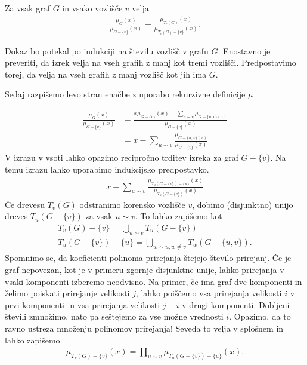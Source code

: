 \begin{lema}
    Za vsak graf \(G\) in vsako vozlišče \(v\) velja
    \begin{align*}
        \frac{\mu_G(x)}{\mu_{G-\{v\}}(x)} = \frac{\mu_{T_v(G)}(x)}{\mu_{T_v(G)-\{v\}}(x)}.
    \end{align*}
\end{lema}
\begin{dokaz}
    Dokaz bo potekal po indukciji na številu vozlišč v grafu \(G\). Enostavno je preveriti, da izrek velja na vseh grafih z manj kot tremi vozlišči. Predpostavimo torej, da velja na vseh grafih z manj vozlišč kot jih ima \(G\).

    Sedaj razpišemo levo stran enačbe z uporabo rekurzivne definicije \(\mu\)

    \begin{align*}
        \frac{\mu_G(x)}{\mu_{G-\{v\}}(x)} & = \frac{x \mu_{G-\{v\}}(x) - \sum_{u\sim v}\mu_{G-\{u, v\}(x)}}{\mu_{G-\{v\}}(x)} \\
                                          & = x - \sum_{u\sim v}\frac{\mu_{G-\{u, v\}(x)}}{\mu_{G-\{v\}}(x)}
    \end{align*}
    V izrazu v vsoti lahko opazimo recipročno trditev izreka za graf \(G-\{v\}\). Na temu izrazu lahko uporabimo indukcijsko predpostavko.
    \begin{align}\label{lemamatching}
        x - \sum_{u\sim v}\frac{\mu_{T_u(G-\{v\}) - \{u\}}(x)}{\mu_{T_u(G-\{v\})}(x)}
    \end{align}
    Če drevesu \(T_v(G)\) odstranimo korensko vozlišče \(v\), dobimo (disjunktno) unijo dreves \(T_u(G-\{v\})\) za vsak \(u\sim v\). To lahko zapišemo kot
    \begin{align*}
        T_v(G) - \{v\} = \bigcup_{u\sim v} T_u(G-\{v\}) \\
        T_u(G - \{v\}) - \{u\} = \bigcup_{w\sim u, w\neq v} T_w(G-\{u, v\}).
    \end{align*}
    Spomnimo se, da koeficienti polinoma prirejanja štejejo število prirejanj. Če je graf nepovezan, kot je v primeru zgornje disjunktne unije, lahko prirejanja v vsaki komponenti izberemo neodvisno. Na primer, če ima graf dve komponenti in želimo poiskati prirejanje velikosti \(j\), lahko poiščemo vsa prirejanja velikosti \(i\) v prvi komponenti in vsa prirejanja velikosti \(j-i\) v drugi komponenti. Dobljeni števili zmnožimo, nato pa seštejemo za vse možne vrednosti \(i\). Opazimo, da to ravno ustreza množenju polinomov prirejanja! Seveda to velja v splošnem in lahko zapišemo
    \begin{align*}
        \mu_{T_v(G) - \{v\}}(x) = \prod_{u\sim v} \mu_{T_u(G-\{v\}) - \{u\}}(x).
    \end{align*}


\end{dokaz}
